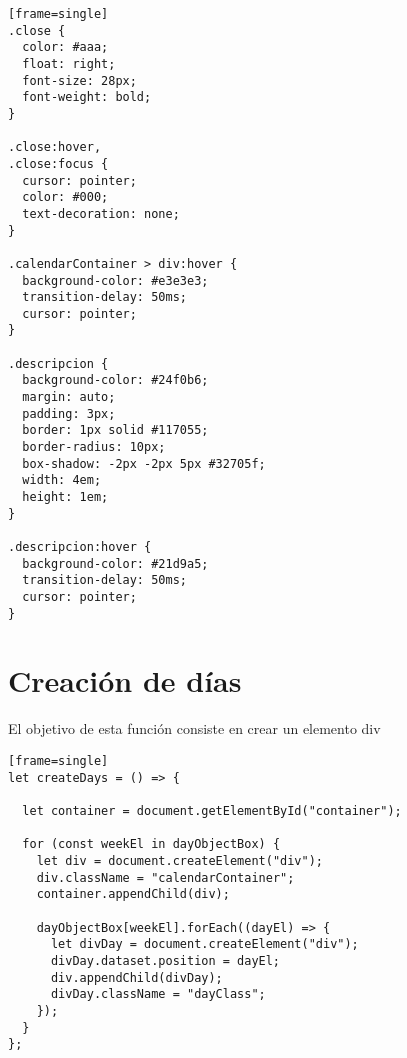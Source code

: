\documentclass[12pt]{article}
\begin{document}
\begin{lstlisting}[style=css][frame=single]
.close {
  color: #aaa;
  float: right;
  font-size: 28px;
  font-weight: bold;
}

.close:hover,
.close:focus {
  cursor: pointer;
  color: #000;
  text-decoration: none;
}

.calendarContainer > div:hover {
  background-color: #e3e3e3;
  transition-delay: 50ms;
  cursor: pointer;
}

.descripcion {
  background-color: #24f0b6;
  margin: auto;
  padding: 3px;
  border: 1px solid #117055;
  border-radius: 10px;
  box-shadow: -2px -2px 5px #32705f;
  width: 4em;
  height: 1em;
}

.descripcion:hover {
  background-color: #21d9a5;
  transition-delay: 50ms;
  cursor: pointer;
}

\end{lstlisting}
\section{Creación de días}
El objetivo de esta función consiste en crear un elemento div

\begin{lstlisting}[style=htmlcssjs][frame=single]
let createDays = () => {

  let container = document.getElementById("container");

  for (const weekEl in dayObjectBox) {
    let div = document.createElement("div");
    div.className = "calendarContainer";
    container.appendChild(div);

    dayObjectBox[weekEl].forEach((dayEl) => {
      let divDay = document.createElement("div");
      divDay.dataset.position = dayEl;
      div.appendChild(divDay);
      divDay.className = "dayClass";
    });
  }
};
\end{lstlisting}

\end{document}
